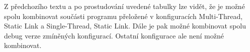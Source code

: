 Z předchozího textu a po prostudování uvedené tabulky lze vidět, že je možné spolu kombinovat součásti programu přeložené v konfiguracích Multi-Thread, Static Link a Single-Thread, Static Link. Dále je pak možné kombinovat spolu debug verze zmíněných konfigurací. Ostatní konfigurace ale není možné kombinovat.




